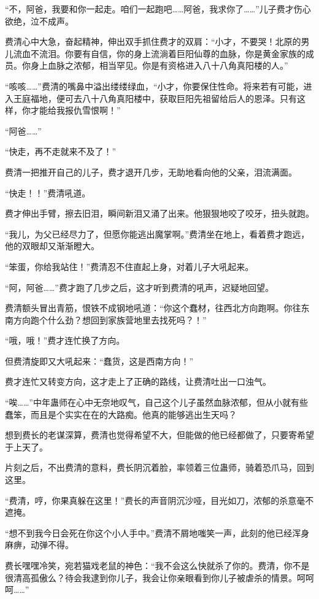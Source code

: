\begin{this_body}
“不，阿爸，我要和你一起走。咱们一起跑吧……阿爸，我求你了……”儿子费才伤心欲绝，泣不成声。

费清心中大急，奋起精神，伸出双手抓住费才的双肩：“小才，不要哭！北原的男儿流血不流泪。你要有自信，你的身上流淌着巨阳仙尊的血脉，你是黄金家族的成员。你身上血脉之浓郁，相当罕见。你是有资格进入八十八角真阳楼的人。”

“咳咳……”费清的嘴鼻中溢出缕缕绿血，“小才，你要保住性命。将来若有可能，进入王庭福地，便可去八十八角真阳楼中，获取巨阳先祖留给后人的恩泽。只有这样，你才能给我报仇雪恨啊！”

“阿爸……”

“快走，再不走就来不及了！”

费清一把推开自己的儿子，费才退开几步，无助地看向他的父亲，泪流满面。

“快走！！”费清吼道。

费才伸出手臂，擦去旧泪，瞬间新泪又涌了出来。他狠狠地咬了咬牙，扭头就跑。

“我儿，为父已经尽力了，但愿你能逃出魔掌啊。”费清坐在地上，看着费才跑远，他的双眼却又渐渐瞪大。

“笨蛋，你给我站住！”费清忍不住直起上身，对着儿子大吼起来。

“阿，阿爸……”费才跑了几步之后，这才听到费清的吼声，迟疑地回望。

费清额头冒出青筋，恨铁不成钢地吼道：“你这个蠢材，往西北方向跑啊。你往东南方向跑个什么劲？想回到家族营地里去找死吗？！”

“哦，哦！”费才连忙换了方向。

但费清旋即又大吼起来：“蠢货，这是西南方向！”

费才连忙又转变方向，这才走上了正确的路线，让费清吐出一口浊气。

“唉……”中年蛊师在心中无奈地叹气，自己这个儿子虽然血脉浓郁，但从小就有些蠢笨，而且是个实实在在的大路痴。他真的能够逃出生天吗？

想到费长的老谋深算，费清也觉得希望不大，但能做的他已经都做了，只要寄希望于上天了。

片刻之后，不出费清的意料，费长阴沉着脸，率领着三位蛊师，骑着恐爪马，回到这里。

“费清，哼，你果真躲在这里！”费长的声音阴沉沙哑，目光如刀，浓郁的杀意毫不遮掩。

“想不到我今日会死在你这个小人手中。”费清不屑地嗤笑一声，此刻的他已经浑身麻痹，动弹不得。

费长嘿嘿冷笑，宛若猫戏老鼠的神色：“我不会这么快就杀了你的。费清，你不是很清高孤傲么？待会我逮到你儿子，我会让你亲眼看到你儿子被虐杀的情景。呵呵呵……”


\end{this_body}
